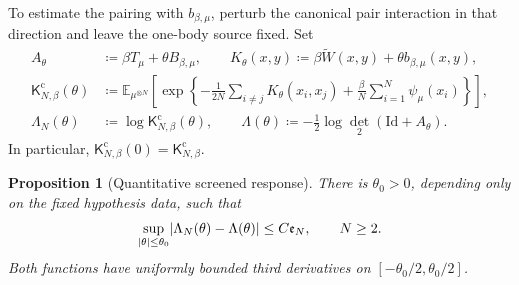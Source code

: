 \documentclass[11pt,reqno]{amsart}
\numberwithin{equation}{section}
\theoremstyle{plain}
\newtheorem{prop}[prop]{Proposition}
\theoremstyle{remark}
\DeclarePairedDelimiter{\abs}{\lvert}{\rvert}
\newcommand{\E}{{\mathbb{E}}}
\newcommand{\K}{{\mathsf{K}}}
\newcommand{\tl}{\widetilde}
\newcommand{\be}{\beta}
\newcommand{\detTwo}{\operatorname{det}_2}
\begin{document}
To estimate the pairing with $b_{\be,\mu}$, perturb the canonical pair
interaction in that direction and leave the one-body source fixed.  Set
\begin{align}
 A_\theta&\coloneqq\be T_\mu+\theta B_{\be,\mu},\qquad
 K_\theta(x,y)\coloneqq\be\tl W(x,y)+\theta b_{\be,\mu}(x,y),
 \label{eq:quantitative-response-operator}\\
 \K^{\mathrm c}_{N,\be}(\theta)
 &\coloneqq\E_{\mu^{\otimes N}}\left[
 \exp\left\{-\frac1{2N}\sum_{i\ne j}K_\theta(x_i,x_j)
                  +\frac\be N\sum_{i=1}^N\psi_\mu(x_i)\right\}\right],
 \label{eq:quantitative-response-partition}\\
 \Lambda_N(\theta)&\coloneqq\log\K^{\mathrm c}_{N,\be}(\theta),\qquad
 \Lambda(\theta)\coloneqq-\frac12\log\detTwo(\mathrm{Id}+A_\theta).
 \label{eq:quantitative-response-logpartition}
\end{align}
In particular, $\K^{\mathrm c}_{N,\be}(0)=\K^{\mathrm c}_{N,\be}$.

\begin{prop}[Quantitative screened response]
\label{prop:quantitative-screened-response}
There is $\theta_0>0$, depending only on the fixed hypothesis data, such that
\begin{equation}\label{eq:quantitative-response-rate}
 \sup_{\abs\theta\leq\theta_0}
       \abs{\Lambda_N(\theta)-\Lambda(\theta)}
 \leq C\mathfrak e_N,\qquad N\geq2.
\end{equation}
Both functions have uniformly bounded third derivatives on
$[-\theta_0/2,\theta_0/2]$.
\end{prop}
\end{document}
